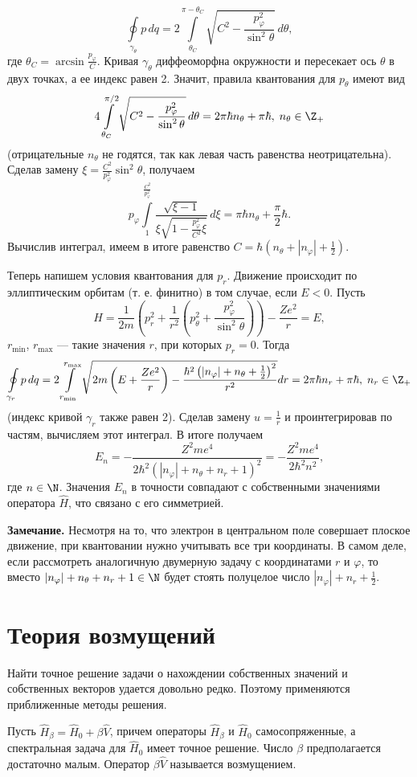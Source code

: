 \documentclass[a4paper
]{article}
\begin{document}
$$\oint \limits_{\gamma_\theta}p \, dq=2\int \limits _{\theta_C}^{\pi-
\theta_C}\sqrt{C^2-\frac{p^2_{\varphi}}{\sin^2\theta}}\, d\theta,$$ где
$\theta_C=\arcsin \frac{p_\varphi}{C}$. Кривая $\gamma_\theta$
диффеоморфна окружности и пересекает ось $\theta$ в двух точках,
а ее индекс равен 2. Значит, правила квантования для $p_\theta$ имеют
вид $$4\int \limits _{\theta_C}^{\pi/2}\sqrt{C^2-\frac{p^2_\varphi}
{\sin^2\theta}}\, d\theta=2\pi\hbar n_{\theta}+\pi\hbar, \;
n_\theta\in \Z_+$$ (отрицательные $n_\theta$ не годятся, так как
левая часть равенства неотрицательна).
Сделав замену $\xi=\frac{C^2}{p_{\varphi}^2}\sin^2\theta$, получаем
$$p_\varphi\int \limits_1^{\frac{C^2}{p_{\varphi}^2}}\frac
{\sqrt{\xi-1}}{\xi\sqrt{1-\frac{p_{\varphi}^2}{C^2}\xi}}\, d\xi=
\pi\hbar n_\theta+\frac{\pi}{2}\hbar.$$ Вычислив интеграл, имеем в итоге
равенство $C=\hbar\left(n_\theta+|n_\varphi|+\frac12\right)$. \par
Теперь напишем условия квантования для $p_r$. Движение происходит по
эллиптическим орбитам (т. е. финитно) в том случае, если $E<0$.
Пусть
$$H=\frac{1}{2m}\left(p_r^2+\frac{1}{r^2}\left(p_\theta^2+\frac{p_\varphi
^2}{\sin^2\theta}\right)\right)-\frac{Ze^2}{r}=E,$$
$r_{\min}$, $r_{\max}$ --- такие значения $r$, при которых $p_r=0$. Тогда
$$\oint \limits_{\gamma_r} p\, dq=2\int \limits_{r_{\min}}^{r_{\max}}
\sqrt{2m\left(E+\frac{Ze^2}{r}\right)-\frac{\hbar^2\left(|n_\varphi|+
n_\theta+\frac12\right)^2}{r^2}}dr=2\pi\hbar n_r+\pi\hbar,\; n_r\in \Z_+$$
(индекс кривой $\gamma_r$ также равен 2). Сделав замену $u=\frac{1}{r}$ и
проинтегрировав по частям, вычисляем этот интеграл. В итоге получаем
$$E_n=-\frac{Z^2me^4}{2\hbar^2(|n_\varphi|+n_\theta+n_r+1)^2}=-\frac{Z^2me^4}
{2\hbar^2n^2},$$
где $n\in \N$. Значения $E_n$ в точности совпадают с собственными значениями
оператора $\hat H$, что связано с его симметрией. \par
{\bf Замечание.} Несмотря на то, что электрон в центральном поле совершает
плоское движение, при квантовании нужно учитывать все три координаты. В
самом деле, если рассмотреть аналогичную двумерную задачу с координатами
$r$ и $\varphi$, то вместо $|n_\varphi|+n_\theta+n_r+1\in \N$ будет стоять
полуцелое число $|n_\varphi|+n_r+\frac12$.
\section{Теория возмущений}
Найти точное решение задачи о нахождении собственных значений и
собственных векторов удается довольно редко. Поэтому применяются приближенные
методы решения. \par
Пусть $\hat H_\beta=\hat H_0+\beta \hat V$, причем операторы $\hat H_\beta$
и $\hat H_0$ самосопряженные, а спектральная задача для $\hat H_0$ имеет
точное решение. Число $\beta$ предполагается достаточно малым. Оператор
$\beta\hat V$ называется возмущением.
\end{document}
